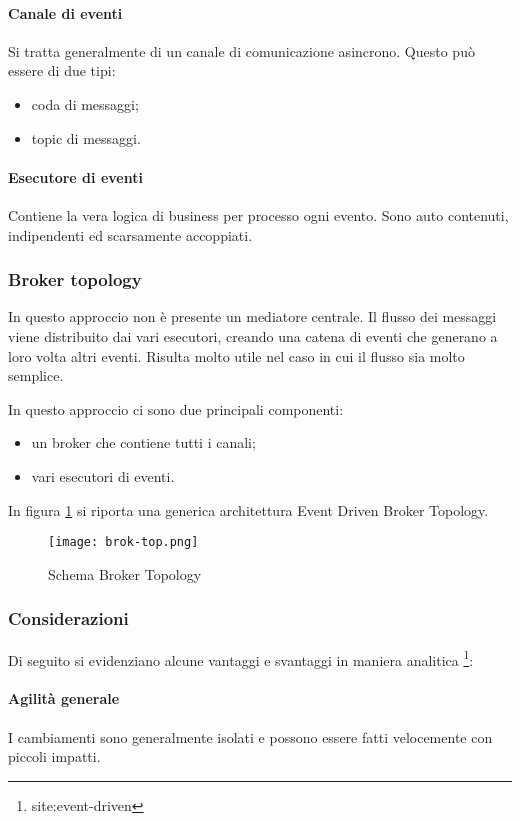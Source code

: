 \paragraph{Canale di eventi}
Si tratta generalmente di un canale di comunicazione asincrono. Questo può essere di due tipi:
\begin{itemize}
    \item coda di messaggi;
    \item topic di messaggi.
\end{itemize}
\paragraph{Esecutore di eventi}
Contiene la vera logica di business per processo ogni evento. Sono auto contenuti, indipendenti ed scarsamente accoppiati.



\subsubsection{Broker topology}
In questo approccio non è presente un mediatore centrale. Il flusso dei messaggi viene distribuito dai vari esecutori, creando una catena di eventi che generano a loro volta altri eventi. Risulta molto utile nel caso in cui il flusso sia molto semplice. 

In questo approccio ci sono due principali componenti:
\begin{itemize}
    \item un broker che contiene tutti i canali;
    \item vari esecutori di eventi.
\end{itemize}
    
In figura \ref{fig:eventdriven-bro-top} si riporta una generica architettura Event Driven Broker Topology.

\begin{figure}[htbp]
    \centering
    \texttt{[image: brok-top.png]} 
    \caption{Schema Broker Topology}
    \label{fig:eventdriven-bro-top} 
\end{figure}

\subsubsection{Considerazioni}
Di seguito si evidenziano alcune vantaggi e svantaggi in maniera analitica \footnote{site:event-driven}:
\paragraph{Agilità generale}
I cambiamenti sono generalmente isolati e possono essere fatti velocemente con piccoli impatti.

